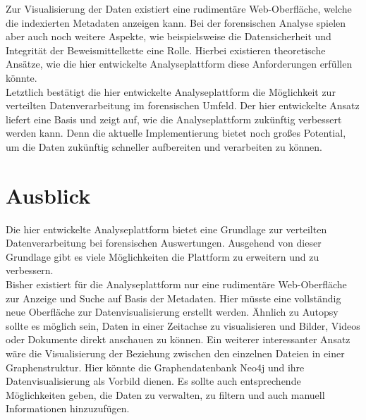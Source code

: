 \noindent
Zur Visualisierung der Daten existiert eine rudimentäre Web-Oberfläche, welche die indexierten Metadaten anzeigen kann. Bei der forensischen Analyse spielen aber auch noch weitere Aspekte, wie beispielsweise die Datensicherheit und Integrität der Beweismittelkette eine Rolle. Hierbei existieren theoretische Ansätze, wie die hier entwickelte Analyseplattform diese Anforderungen erfüllen könnte.\\

\noindent
Letztlich bestätigt die hier entwickelte Analyseplattform die Möglichkeit zur verteilten Datenverarbeitung im forensischen Umfeld. Der hier entwickelte Ansatz liefert eine Basis und zeigt auf, wie die Analyseplattform zukünftig verbessert werden kann. Denn die aktuelle Implementierung bietet noch großes Potential, um die Daten zukünftig schneller aufbereiten und verarbeiten zu können.\\

\chapter{Ausblick}
\label{ch:ausblick}

Die hier entwickelte Analyseplattform bietet eine Grundlage zur verteilten Datenverarbeitung bei forensischen Auswertungen. Ausgehend von dieser Grundlage gibt es viele Möglichkeiten die Plattform zu erweitern und zu verbessern.\\
Bisher existiert für die Analyseplattform nur eine rudimentäre Web-Oberfläche zur Anzeige und Suche auf Basis der Metadaten. Hier müsste eine vollständig neue Oberfläche zur Datenvisualisierung erstellt werden. Ähnlich zu Autopsy sollte es möglich sein, Daten in einer Zeitachse zu visualisieren und Bilder, Videos oder Dokumente direkt anschauen zu können. Ein weiterer interessanter Ansatz wäre die Visualisierung der Beziehung zwischen den einzelnen Dateien in einer Graphenstruktur. Hier könnte die Graphendatenbank Neo4j und ihre Datenvisualisierung als Vorbild dienen. Es sollte auch entsprechende Möglichkeiten geben, die Daten zu verwalten, zu filtern und auch manuell Informationen hinzuzufügen.\\

